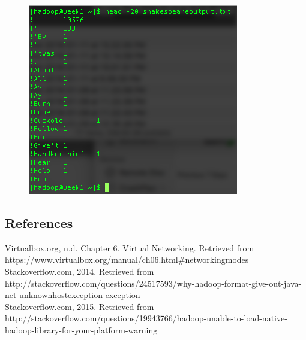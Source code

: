 \documentclass[10pt]{article}
\begin{document}
\begin{figure}[!h]
\includegraphics[scale=0.37]{test_hadoop.png}
\centering
\end{figure}
\subsection*{References}
Virtualbox.org, n.d. Chapter 6. Virtual Networking. Retrieved from\\ 
https://www.virtualbox.org/manual/ch06.html\#networkingmodes\\
Stackoverflow.com, 2014. Retrieved from http://stackoverflow.com/questions/24517593/why-hadoop-format-give-out-java-net-unknownhostexception-exception\\
Stackoverflow.com, 2015. Retrieved from http://stackoverflow.com/questions/19943766/hadoop-unable-to-load-native-hadoop-library-for-your-platform-warning
\end{document}
